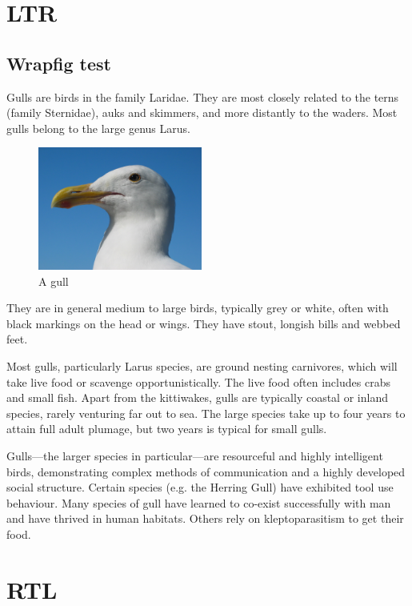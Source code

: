 \documentclass[a4paper,12pt]{article}
\begin{document}
\section{LTR}
\subsection*{Wrapfig test}

Gulls are birds in the family Laridae. They are most closely
 related to the terns (family Sternidae), auks and skimmers,
and more distantly to the waders. Most gulls belong to the
large genus Larus.

\begin{figure}
  \begin{center}
    \includegraphics[width=0.48\textwidth]{gull}
  \end{center}
  \caption{A gull}
\end{figure}

They are in general medium to large birds, typically grey or white,
often with black markings on the head or wings. They have stout,
longish bills and webbed feet.

Most gulls, particularly Larus species, are ground nesting carnivores,
which will take live food or scavenge opportunistically. The live food
often includes crabs and small fish. Apart from the kittiwakes, gulls
are typically coastal or inland species, rarely venturing far out to sea.
The large species take up to four years to attain full adult plumage,
but two years is typical for small gulls.

Gulls---the larger species in particular---are resourceful and
highly intelligent birds, demonstrating complex methods of communication
and a highly developed social structure. Certain species (e.g. the
Herring Gull) have exhibited tool use behaviour. Many species of gull have
learned to co-exist successfully with man and have thrived in human habitats.
Others rely on kleptoparasitism to get their food.

\newpage
\section{RTL}
\end{document}
